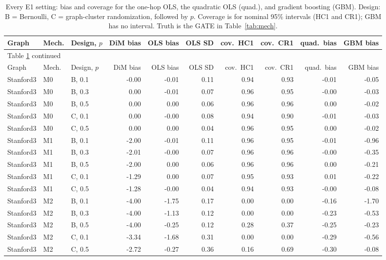 \begin{longtable}{lllrrrrrrr}
\caption{Every E1 setting: bias and coverage for the one-hop OLS, the quadratic OLS (quad.), and gradient boosting (GBM). Design: B = Bernoulli, C = graph-cluster randomization, followed by $p$. Coverage is for nominal 95\% intervals (HC1 and CR1); GBM has no interval. Truth is the GATE in Table~\ref{tab:mech}.} \label{tab:all}\\
\toprule
Graph & Mech. & Design, $p$ & DiM bias & OLS bias & OLS SD & cov.\ HC1 & cov.\ CR1 & quad.\ bias & GBM bias \\
\midrule
\endfirsthead
\multicolumn{10}{l}{\small Table \ref{tab:all} continued} \\
\toprule
Graph & Mech. & Design, $p$ & DiM bias & OLS bias & OLS SD & cov.\ HC1 & cov.\ CR1 & quad.\ bias & GBM bias \\
\midrule
\endhead
\bottomrule
\endfoot
Stanford3 & M0 & B, 0.1 & -0.00 & -0.01 & 0.11 & 0.94 & 0.93 & -0.01 & -0.05 \\
Stanford3 & M0 & B, 0.3 & 0.00 & -0.01 & 0.07 & 0.96 & 0.95 & -0.00 & -0.03 \\
Stanford3 & M0 & B, 0.5 & 0.00 & 0.00 & 0.06 & 0.96 & 0.96 & 0.00 & -0.02 \\
Stanford3 & M0 & C, 0.1 & 0.00 & -0.00 & 0.08 & 0.94 & 0.90 & -0.01 & -0.03 \\
Stanford3 & M0 & C, 0.5 & 0.00 & 0.00 & 0.04 & 0.96 & 0.95 & 0.00 & -0.02 \\
Stanford3 & M1 & B, 0.1 & -2.00 & -0.01 & 0.11 & 0.96 & 0.95 & -0.01 & -0.96 \\
Stanford3 & M1 & B, 0.3 & -2.01 & -0.00 & 0.07 & 0.96 & 0.96 & -0.00 & -0.35 \\
Stanford3 & M1 & B, 0.5 & -2.00 & 0.00 & 0.06 & 0.96 & 0.96 & 0.00 & -0.21 \\
Stanford3 & M1 & C, 0.1 & -1.29 & 0.00 & 0.07 & 0.95 & 0.93 & 0.01 & -0.22 \\
Stanford3 & M1 & C, 0.5 & -1.28 & -0.00 & 0.04 & 0.94 & 0.93 & -0.00 & -0.08 \\
Stanford3 & M2 & B, 0.1 & -4.00 & -1.75 & 0.17 & 0.00 & 0.00 & -0.16 & -1.70 \\
Stanford3 & M2 & B, 0.3 & -4.00 & -1.13 & 0.12 & 0.00 & 0.00 & -0.23 & -0.53 \\
Stanford3 & M2 & B, 0.5 & -4.00 & -0.25 & 0.12 & 0.28 & 0.37 & -0.25 & -0.23 \\
Stanford3 & M2 & C, 0.1 & -3.34 & -1.68 & 0.31 & 0.00 & 0.00 & -0.29 & -0.56 \\
Stanford3 & M2 & C, 0.5 & -2.72 & -0.27 & 0.36 & 0.16 & 0.69 & -0.30 & -0.08 \\

\end{longtable}
